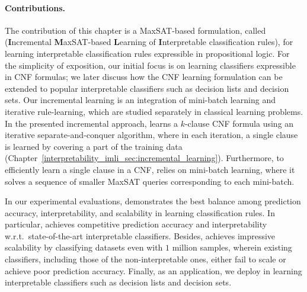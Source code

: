 \paragraph{Contributions.} The contribution of this chapter is a MaxSAT-based formulation, called {\imli} (\textbf{I}ncremental \textbf{M}axSAT-based \textbf{L}earning of \textbf{I}nterpretable classification rules), for learning interpretable classification rules expressible in propositional logic. For the simplicity of exposition, our initial focus is on learning classifiers expressible in CNF formulas; we later discuss how the CNF learning formulation can be extended to popular interpretable classifiers such as decision lists and decision sets. Our incremental learning is an integration of mini-batch learning and iterative rule-learning, which are studied separately in classical learning problems. In the presented incremental approach, {\imli} learns a $ k $-clause CNF formula using an iterative separate-and-conquer algorithm, where in each iteration, a single clause is learned by covering a part of the training data (Chapter~\ref{interpretability_imli_sec:incremental_learning}). Furthermore, to efficiently learn a single clause in a CNF, {\imli} relies on mini-batch learning, where it solves a sequence of smaller MaxSAT queries corresponding to each mini-batch. 



In our experimental evaluations, {\imli} demonstrates the best balance among prediction accuracy, interpretability, and scalability in learning classification rules. In particular, {\imli} achieves competitive prediction accuracy and interpretability w.r.t.\ state-of-the-art interpretable classifiers. Besides, {\imli} achieves impressive scalability by classifying datasets even with $ 1 $ million samples, wherein existing classifiers, including those of the non-interpretable ones, either fail to scale or achieve poor prediction accuracy. Finally, as an application, we deploy {\imli} in learning interpretable classifiers such as decision lists and decision sets.





